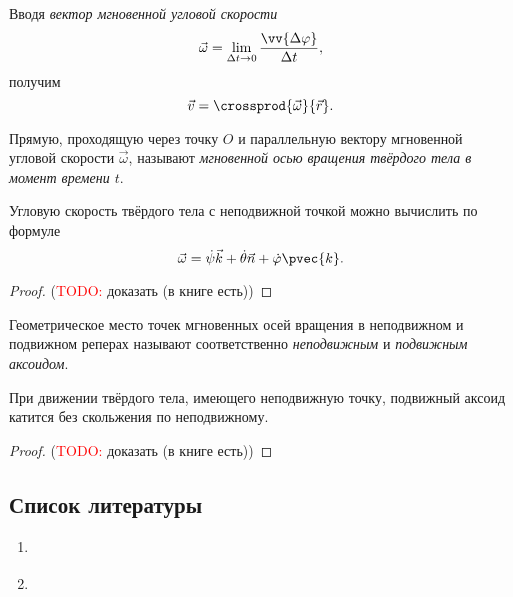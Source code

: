 Вводя \textit{вектор мгновенной угловой скорости}
\begin{equation*}
  \vec{\omega} = \lim_{\Delta t \to 0} \frac{\vv{\Delta \varphi}}{\Delta t},
\end{equation*}
получим
\begin{equation*}
  \vec{v} = \crossprod{\vec{\omega}}{\vec{r}}.
\end{equation*}

\begin{definition}
  Прямую, проходящую через точку $O$ и параллельную вектору мгновенной угловой
  скорости $\vec{\omega}$, называют \textit{мгновенной осью вращения твёрдого
  тела в момент времени $t$}.
\end{definition}

\begin{theorem}
  Угловую скорость твёрдого тела с неподвижной точкой можно вычислить по формуле
  \begin{equation}
    \vec{\omega} = \dot{\psi} \vec{k} + \dot{\theta} \vec{n} + \dot{\varphi}
      \pvec{k}.
  \end{equation}
\end{theorem}

\begin{proof}
  (\textcolor{red}{TODO:} доказать (в книге есть))
\end{proof}

\begin{definition}
  Геометрическое место точек мгновенных осей вращения в неподвижном и подвижном
  реперах называют соответственно \textit{неподвижным} и \textit{подвижным
  аксоидом}.
\end{definition}

\begin{theorem}[Пуансо]
  При движении твёрдого тела, имеющего неподвижную точку, подвижный аксоид
  катится без скольжения по неподвижному.
\end{theorem}

\begin{proof}
  (\textcolor{red}{TODO:} доказать (в книге есть))
\end{proof}

\subsection{Список литературы}
\begin{enumerate}
  \item \cite{lectures}
  \item \cite{lourie}
\end{enumerate}

